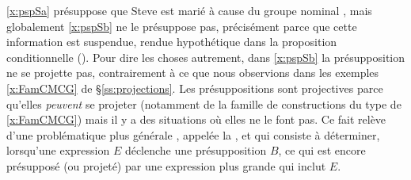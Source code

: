 \begin{refsegment}
\ref{x:pspSa} présuppose que Steve est marié à cause du groupe nominal , mais globalement \ref{x:pspSb}  ne le présuppose pas, précisément parce que cette information est suspendue, rendue hypothétique dans la proposition conditionnelle ().  
Pour dire les choses autrement, dans \ref{x:pspSb} la présupposition ne se projette pas, contrairement à ce que nous observions dans les exemples \ref{x:FamCMCG} de \S\ref{ss:projections}. Les présuppositions sont projectives parce qu'elles \emph{peuvent} se projeter (notamment de la famille de constructions du type de \ref{x:FamCMCG}) mais il y a des situations où elles ne le font pas.
Ce fait relève d'une problématique plus générale%
, appelée la ,\label{p.projpsp} et qui consiste à déterminer, lorsqu'une expression $E$ déclenche une présupposition $B$, ce qui est encore présupposé (ou projeté) par une expression plus grande qui inclut $E$. 


\end{refsegment}
